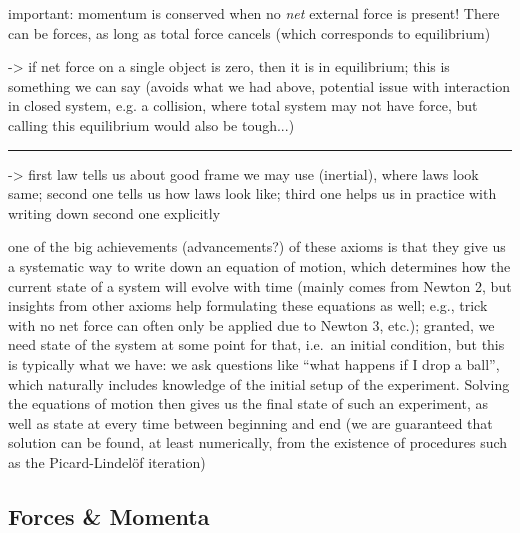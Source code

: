 \documentclass[../class_mech_main.tex]{subfiles}
\begin{document}
important: momentum is conserved when no \emph{net} external force is present! There can be forces, as long as total force cancels (which corresponds to equilibrium)

-> if net force on a single object is zero, then it is in equilibrium; this is something we can say (avoids what we had above, potential issue with interaction in closed system, e.g. a collision, where total system may not have force, but calling this equilibrium would also be tough...)


\hrule


-> first law tells us about good frame we may use (inertial), where laws look same; second one tells us how laws look like; third one helps us in practice with writing down second one explicitly

one of the big achievements (advancements?) of these axioms is that they give us a systematic way to write down an equation of motion, which determines how the current state of a system will evolve with time (mainly comes from Newton 2, but insights from other axioms help formulating these equations as well; e.g., trick with no net force can often only be applied due to Newton 3, etc.); granted, we need state of the system at some point for that, i.e.~an initial condition, but this is typically what we have: we ask questions like \enquote{what happens if I drop a ball}, which naturally includes knowledge of the initial setup of the experiment. Solving the equations of motion then gives us the final state of such an experiment, as well as state at every time between beginning and end (we are guaranteed that solution can be found, at least numerically, from the existence of procedures such as the Picard-Lindelöf iteration)





        \subsection{Forces \& Momenta}
		\label{sec:forces_and_momenta}
% 
% 
\end{document}
